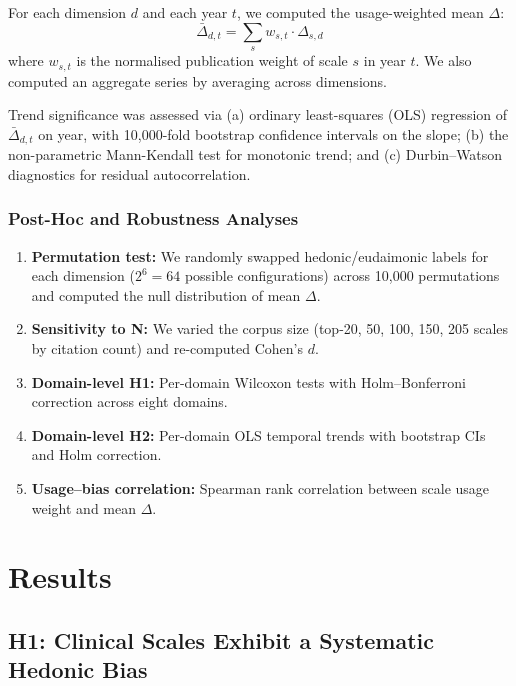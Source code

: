 \documentclass[12pt,a4paper]{article}
\newcommand{\Ddelta}{$\Delta$}
\begin{document}
For each dimension $d$ and each year $t$, we computed the usage-weighted mean \Ddelta:
\begin{equation}
\bar{\Delta}_{d,t} = \sum_{s} w_{s,t} \cdot \Delta_{s,d}
\label{eq:yearly_delta}
\end{equation}
where $w_{s,t}$ is the normalised publication weight of scale $s$ in year $t$.
We also computed an aggregate series by averaging across dimensions.

Trend significance was assessed via (a) ordinary least-squares (OLS) regression of $\bar{\Delta}_{d,t}$ on year, with 10{,}000-fold bootstrap confidence intervals on the slope; (b) the non-parametric Mann-Kendall test for monotonic trend; and (c) Durbin--Watson diagnostics for residual autocorrelation.

\subsubsection{Post-Hoc and Robustness Analyses}

\begin{enumerate}
    \item \textbf{Permutation test:} We randomly swapped hedonic/eudaimonic labels for each dimension ($2^6 = 64$ possible configurations) across 10{,}000 permutations and computed the null distribution of mean \Ddelta.
    \item \textbf{Sensitivity to N:} We varied the corpus size (top-20, 50, 100, 150, 205 scales by citation count) and re-computed Cohen's $d$.
    \item \textbf{Domain-level H1:} Per-domain Wilcoxon tests with Holm--Bonferroni correction across eight domains.
    \item \textbf{Domain-level H2:} Per-domain OLS temporal trends with bootstrap CIs and Holm correction.
    \item \textbf{Usage--bias correlation:} Spearman rank correlation between scale usage weight and mean \Ddelta{}.
\end{enumerate}

\section{Results}\label{sec:results}

\subsection{H1: Clinical Scales Exhibit a Systematic Hedonic Bias}\label{sec:results-h1}
\end{document}
